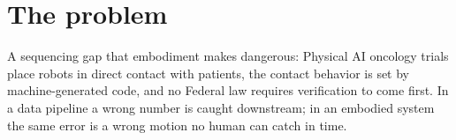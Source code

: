 \section{The problem}
\label{sec:a}

A sequencing gap that embodiment makes dangerous: Physical AI oncology trials place robots in direct contact with patients, the contact behavior is set by machine-generated code, and no Federal law requires verification to come first. In a data pipeline a wrong number is caught downstream; in an embodied system the same error is a wrong motion no human can catch in time.
